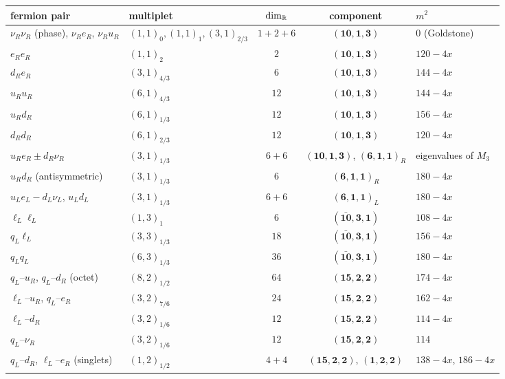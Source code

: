 \begin{table}[t]
\centering
\footnotesize
\setlength{\tabcolsep}{4pt}
\begin{tabular}{@{}llccl@{}}
\toprule
fermion pair & multiplet & $\dim_{\mathbb{R}}$ & component & $m^2$\\
\midrule
$\nu_R\nu_R$ (phase), $\nu_Re_R$, $\nu_Ru_R$ & $(1,1)_0,(1,1)_1,(3,1)_{2/3}$ & $1+2+6$ & $(\mathbf{10},\mathbf1,\mathbf3)$ & $0$ (Goldstone)\\
$e_Re_R$ & $(1,1)_2$ & $2$ & $(\mathbf{10},\mathbf1,\mathbf3)$ & $120-4x$\\
$d_Re_R$ & $(3,1)_{4/3}$ & $6$ & $(\mathbf{10},\mathbf1,\mathbf3)$ & $144-4x$\\
$u_Ru_R$ & $(6,1)_{4/3}$ & $12$ & $(\mathbf{10},\mathbf1,\mathbf3)$ & $144-4x$\\
$u_Rd_R$ & $(6,1)_{1/3}$ & $12$ & $(\mathbf{10},\mathbf1,\mathbf3)$ & $156-4x$\\
$d_Rd_R$ & $(6,1)_{2/3}$ & $12$ & $(\mathbf{10},\mathbf1,\mathbf3)$ & $120-4x$\\
$u_Re_R\pm d_R\nu_R$ & $(3,1)_{1/3}$ & $6+6$ & $(\mathbf{10},\mathbf1,\mathbf3)$, $(\mathbf6,\mathbf1,\mathbf1)_R$ & eigenvalues of $M_3$\\
$u_Rd_R$ (antisymmetric) & $(3,1)_{1/3}$ & $6$ & $(\mathbf6,\mathbf1,\mathbf1)_R$ & $180-4x$\\
$u_Le_L-d_L\nu_L$, $u_Ld_L$ & $(3,1)_{1/3}$ & $6+6$ & $(\mathbf6,\mathbf1,\mathbf1)_L$ & $180-4x$\\
$\ell_L\ell_L$ & $(1,3)_1$ & $6$ & $(\bar{\mathbf{10}},\mathbf3,\mathbf1)$ & $108-4x$\\
$q_L\ell_L$ & $(3,3)_{1/3}$ & $18$ & $(\bar{\mathbf{10}},\mathbf3,\mathbf1)$ & $156-4x$\\
$q_Lq_L$ & $(6,3)_{1/3}$ & $36$ & $(\bar{\mathbf{10}},\mathbf3,\mathbf1)$ & $180-4x$\\
$q_L$--$u_R$, $q_L$--$d_R$ (octet) & $(8,2)_{1/2}$ & $64$ & $(\mathbf{15},\mathbf2,\mathbf2)$ & $174-4x$\\
$\ell_L$--$u_R$, $q_L$--$e_R$ & $(3,2)_{7/6}$ & $24$ & $(\mathbf{15},\mathbf2,\mathbf2)$ & $162-4x$\\
$\ell_L$--$d_R$ & $(3,2)_{1/6}$ & $12$ & $(\mathbf{15},\mathbf2,\mathbf2)$ & $114-4x$\\
$q_L$--$\nu_R$ & $(3,2)_{1/6}$ & $12$ & $(\mathbf{15},\mathbf2,\mathbf2)$ & $114$\\
$q_L$--$d_R$, $\ell_L$--$e_R$ (singlets) & $(1,2)_{1/2}$ & $4+4$ & $(\mathbf{15},\mathbf2,\mathbf2)$, $(\mathbf1,\mathbf2,\mathbf2)$ & $138-4x$, $186-4x$\\

\end{tabular}
\end{table}
